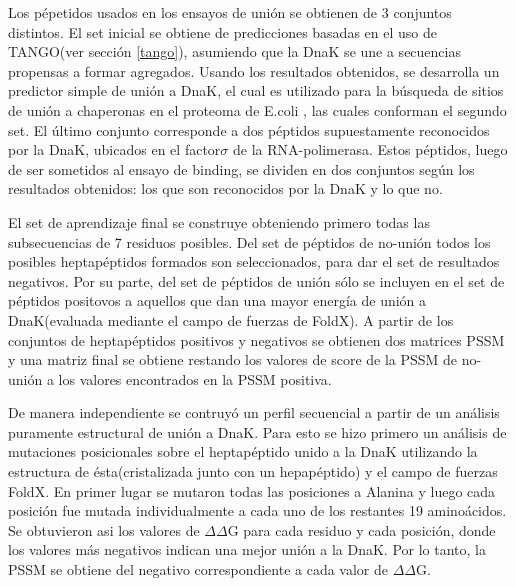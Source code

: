 Los pépetidos usados en los ensayos de unión se obtienen de 3 conjuntos distintos. El set inicial se obtiene de predicciones basadas en el uso de TANGO\cite{fernandez2004prediction}(ver sección \ref{tango}),
asumiendo que la DnaK se une a secuencias propensas a formar agregados.
Usando los resultados obtenidos, se desarrolla un predictor simple de unión a DnaK, el cual es utilizado para la búsqueda de sitios de unión a chaperonas en el proteoma de E.coli 
, las cuales conforman el segundo set. El último conjunto corresponde a dos péptidos supuestamente reconocidos por la DnaK, ubicados en el factor$\sigma$ de la RNA-polimerasa.
Estos péptidos, luego de ser sometidos al ensayo de binding, se dividen en dos conjuntos según los resultados obtenidos:
los que son reconocidos por la DnaK y lo que no. 

El set de aprendizaje final se construye obteniendo primero todas las subsecuencias de 7 residuos posibles. 
Del set de péptidos de no-unión todos los posibles heptapéptidos formados son seleccionados, para dar el set de resultados negativos.
Por su parte, del set de péptidos de unión sólo se incluyen en el set de péptidos positovos a aquellos que dan una mayor energía de unión a DnaK(evaluada mediante el campo de fuerzas de FoldX).
A partir de los conjuntos de heptapéptidos positivos y negativos se obtienen dos matrices PSSM y una matriz final se obtiene restando los valores de score de la PSSM de no-unión a los valores encontrados en la PSSM positiva.

De manera independiente se contruyó un perfil secuencial a partir de un análisis puramente estructural de unión a DnaK.
Para esto se hizo primero un análisis de mutaciones posicionales sobre el heptapéptido unido a la DnaK utilizando la estructura de ésta(cristalizada junto con un hepapéptido) y el campo de fuerzas FoldX. 
En primer lugar se mutaron todas las posiciones a Alanina y luego cada posición fue mutada individualmente a cada uno de los restantes 19 aminoácidos.
Se obtuvieron asi los valores de $\Delta\Delta$G para cada residuo y cada posición, donde los valores más negativos indican una mejor unión a la DnaK.
Por lo tanto, la PSSM se obtiene del negativo correspondiente a cada valor de $\Delta\Delta$G.

